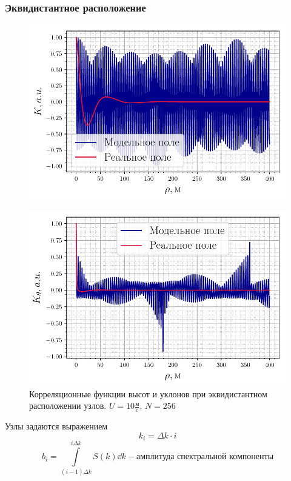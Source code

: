 \documentclass[10pt,pdf,hyperref={unicode}, dvipsnames]{beamer}
\begin{document}
\begin{frame}[t]\frametitle{Эквидистантное расположение}
	\begin{figure}[h!]
		\begin{minipage}{0.49\textheight}
				\centering
				\includegraphics[width=\linewidth]{fig/correlation_height_lin.pdf}
				\label{fig:ch0}		
		\end{minipage}
		\hfill
		\begin{minipage}{0.49\linewidth}
				\centering
				\includegraphics[width=\linewidth]{fig/correlation_angles_lin.pdf}
		\end{minipage}
		\caption{Корреляционные функции высот и уклонов при эквидистантном расположении узлов. $U=10 \frac{\text{м}}{\text{c}}$, $N=256$}
				\label{fig:ca0}		
	\vspace{-20pt}
	\end{figure}
	Узлы задаются выражением
	\begin{equation}
		k_i=\Delta k\cdot i
	\end{equation}
	\begin{equation*}
	b_i = \int\limits_{(i-1)\Delta k}^{i \Delta k} S(k) \dd{k} -
	\text{амплитуда спектральной компоненты}
	\end{equation*}


\end{frame}
\end{document}
